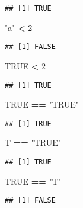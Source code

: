 \documentclass[
]{book}
\newenvironment{Shaded}{\begin{snugshade}}{\end{snugshade}}
\newcommand{\DecValTok}[1]{\textcolor[rgb]{0.00,0.00,0.81}{#1}}
\newcommand{\NormalTok}[1]{#1}
\newcommand{\OperatorTok}[1]{\textcolor[rgb]{0.81,0.36,0.00}{\textbf{#1}}}
\newcommand{\OtherTok}[1]{\textcolor[rgb]{0.56,0.35,0.01}{#1}}
\newcommand{\StringTok}[1]{\textcolor[rgb]{0.31,0.60,0.02}{#1}}
\begin{document}
\begin{verbatim}
## [1] TRUE
\end{verbatim}

\begin{Shaded}
\begin{Highlighting}[]
\StringTok{"a"} \OperatorTok{\textless{}}\StringTok{ }\DecValTok{2}
\end{Highlighting}
\end{Shaded}

\begin{verbatim}
## [1] FALSE
\end{verbatim}

\begin{Shaded}
\begin{Highlighting}[]
\OtherTok{TRUE} \OperatorTok{\textless{}}\StringTok{ }\DecValTok{2}
\end{Highlighting}
\end{Shaded}

\begin{verbatim}
## [1] TRUE
\end{verbatim}

\begin{Shaded}
\begin{Highlighting}[]
\OtherTok{TRUE} \OperatorTok{==}\StringTok{ "TRUE"}
\end{Highlighting}
\end{Shaded}

\begin{verbatim}
## [1] TRUE
\end{verbatim}

\begin{Shaded}
\begin{Highlighting}[]
\NormalTok{T }\OperatorTok{==}\StringTok{ "TRUE"}
\end{Highlighting}
\end{Shaded}

\begin{verbatim}
## [1] TRUE
\end{verbatim}

\begin{Shaded}
\begin{Highlighting}[]
\OtherTok{TRUE} \OperatorTok{==}\StringTok{ "T"}
\end{Highlighting}
\end{Shaded}

\begin{verbatim}
## [1] FALSE
\end{verbatim}
\end{document}
